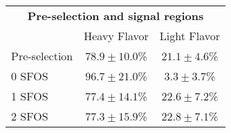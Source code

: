     \begin{tabular}{|l||cc|}
    \hline 
    \multicolumn{3}{|c|}{\bf{Pre-selection and signal regions}}   \\ 
    & Heavy Flavor & Light Flavor \\
    \hline \hline
    \hline

    Pre-selection &$78.9 \pm 10.0$\% & $21.1\pm 4.6$\% \\
    0 SFOS &$96.7 \pm 21.0$\% & $3.3\pm 3.7$\% \\
    1 SFOS &$77.4 \pm 14.1$\% & $22.6\pm 7.2$\% \\
    2 SFOS &$77.3 \pm 15.9$\% & $22.8\pm 7.1$\% \\
    \hline


  \end{tabular}
  







